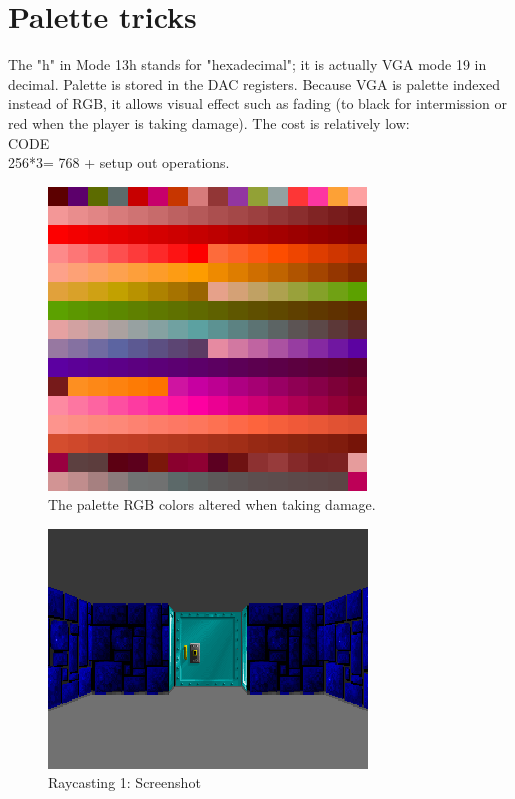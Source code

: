 \documentclass[book.tex]{subfiles}
\begin{document}
\section{Palette tricks}
The "h" in Mode 13h stands for "hexadecimal"; it is actually VGA mode 19 in decimal.
Palette is stored in the DAC registers.
Because VGA is palette indexed instead of RGB, it allows visual effect such as fading (to black for intermission or red when the player is taking damage). The cost is relatively low:\\
CODE\\
256*3= 768 + setup out operations.
\begin{figure}[H]
  \centering
 \includegraphics[scale=1.3]{imgs/palette_damage.png}
 \caption{The palette RGB colors altered when taking damage.} \label{fig:palette_damage}
\end{figure}



\begin{figure}[H]
  \centering
 \includegraphics[scale=1.3]{imgs/ray_caster_explained/beginning.png}
 \caption{Raycasting 1: Screenshot} \label{fig:Raycasting2Drawing}
\end{figure}
\end{document}
